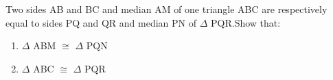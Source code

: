 Two sides AB and BC and median AM of one
triangle ABC are respectively equal to sides PQ
and QR and median PN of $\Delta$ PQR.Show that:

\begin{enumerate}[label = (\alph*)]
\item$\Delta$ ABM $\cong$ $\Delta$ PQN  
\item$\Delta$ ABC $\cong$ $\Delta$ PQR
\end{enumerate}
